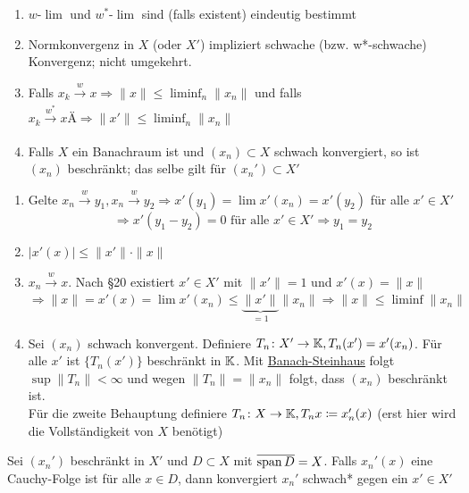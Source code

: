 \begin{eig}
	\begin{enumerate}[label=\alph*\upshape)]
		\item $w$-$\lim$ und $w^{*}$-$\lim$ sind (falls existent) eindeutig bestimmt
		\item Normkonvergenz in $X$ (oder $X'$) impliziert schwache (bzw. w*-schwache) Konvergenz; nicht umgekehrt.
		\item Falls $x_{k} \xrightarrow[]{w} x \Rightarrow \| x \| \leq \liminf_{n} \| x_{n} \|$ und falls $x_{k} \xrightarrow[]{w^{*}} xÄ \Rightarrow \| x' \| \leq \liminf_{n} \| x_{n} \|$ 
		\item Falls $X$ ein Banachraum ist und $(x_{n}) \subset X$ schwach konvergiert, so ist $(x_{n})$ beschränkt; das selbe gilt für $(x_{n}') \subset X'$
	\end{enumerate}	
\end{eig}

\newpage %

\begin{beweis}
	\begin{enumerate}[label=\alph*\upshape)]
		\item Gelte $x_{n} \xrightarrow[]{w} y_{1}, x_{n} \xrightarrow[]{w} y_{2} \Rightarrow x'(y_{1}) = \lim x'(x_{n}) = x'(y_{2})$ für alle $x' \in X'$
			\[ \Rightarrow x'(y_{1} - y_{2}) = 0 \text{ für alle } x' \in X' \Rightarrow y_{1} = y_{2} \]
		\item $| x'(x) | \leq \| x' \| \cdot \| x \|$
		\item $x_{n} \xrightarrow[]{w} x$. Nach \S 20 existiert $x' \in X'$ mit $\| x' \| = 1$ und $x'(x) = \| x \|$
			\[ \Rightarrow \| x \| = x'(x) = \lim x'(x_{n}) \leq \underbrace{\| x' \|}_{= 1} \| x_{n} \| \Rightarrow \| x \| \leq \liminf \| x_{n} \| \]
		\item Sei $(x_{n})$ schwach konvergent. Definiere $T_{n} \colon X' \rightarrow \mathbb{K}, T_{n}(x') = x'(x_{n})$. Für alle $x'$ ist $\{ T_{n}(x') \}$ beschränkt in $\mathbb{K}$. Mit \hyperref[satz:9.5-Banach-Steinhaus]{Banach-Steinhaus} folgt $\sup \| T_{n} \| < \infty$ und wegen $\| T_{n} \| = \| x_{n} \|$ folgt, dass $(x_{n})$ beschränkt ist. \\
			Für die zweite Behauptung definiere $T_{n} \colon X \rightarrow \mathbb{K}, T_{n} x \coloneqq x_{n}'(x)$ (erst hier wird die Vollständigkeit von $X$ benötigt)
	\end{enumerate}		
\end{beweis}


\begin{lemma}
	Sei $(x_{n}')$ beschränkt in $X'$ und $D \subset X$ mit $\overline{\operatorname{span} D} = X$. Falls $x_{n}'(x)$ eine Cauchy-Folge ist für alle $x \in D$, dann konvergiert $x_{n}'$ schwach* gegen ein $x' \in X'$
\end{lemma}

